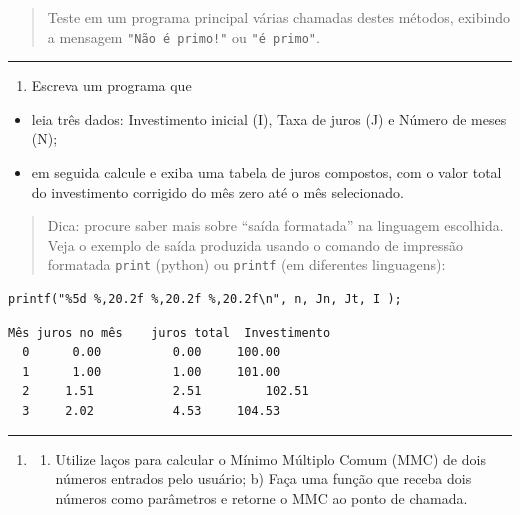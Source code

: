 \documentclass[12pt,a4paper]{article}
\providecommand{\tightlist}{%
      \setlength{\itemsep}{0pt}\setlength{\parskip}{0pt}}
\begin{document}
\begin{quote}
Teste em um programa principal várias chamadas destes métodos, exibindo
a mensagem \texttt{"Não\ é\ primo!"} ou \texttt{"é\ primo"}.
\end{quote}

    \begin{center}\rule{0.5\linewidth}{0.5pt}\end{center}

\begin{enumerate}
\def\labelenumi{\arabic{enumi}.}
\setcounter{enumi}{3}
\tightlist
\item
  Escreva um programa que
\end{enumerate}

\begin{itemize}
\tightlist
\item
  leia três dados: Investimento inicial (I), Taxa de juros (J) e Número
  de meses (N);
\item
  em seguida calcule e exiba uma tabela de juros compostos, com o valor
  total do investimento corrigido do mês zero até o mês selecionado.
\end{itemize}

\begin{quote}
Dica: procure saber mais sobre ``saída formatada'' na linguagem
escolhida. Veja o exemplo de saída produzida usando o comando de
impressão formatada \texttt{print} (python) ou \texttt{printf} (em
diferentes linguagens):
\end{quote}

    \begin{verbatim}
printf("%5d %,20.2f %,20.2f %,20.2f\n", n, Jn, Jt, I );
\end{verbatim}

    \begin{verbatim}
Mês juros no mês    juros total  Investimento
  0      0.00          0.00     100.00
  1      1.00          1.00     101.00
  2     1.51           2.51         102.51
  3     2.02           4.53     104.53
\end{verbatim}

    \begin{center}\rule{0.5\linewidth}{0.5pt}\end{center}

\begin{enumerate}
\def\labelenumi{\arabic{enumi}.}
\setcounter{enumi}{4}
\item
  \begin{enumerate}
  \def\labelenumii{\alph{enumii})}
  \tightlist
  \item
    Utilize laços para calcular o Mínimo Múltiplo Comum (MMC) de dois
    números entrados pelo usuário; b) Faça uma função que receba dois
    números como parâmetros e retorne o MMC ao ponto de chamada.
  \end{enumerate}
\end{enumerate}
\end{document}
